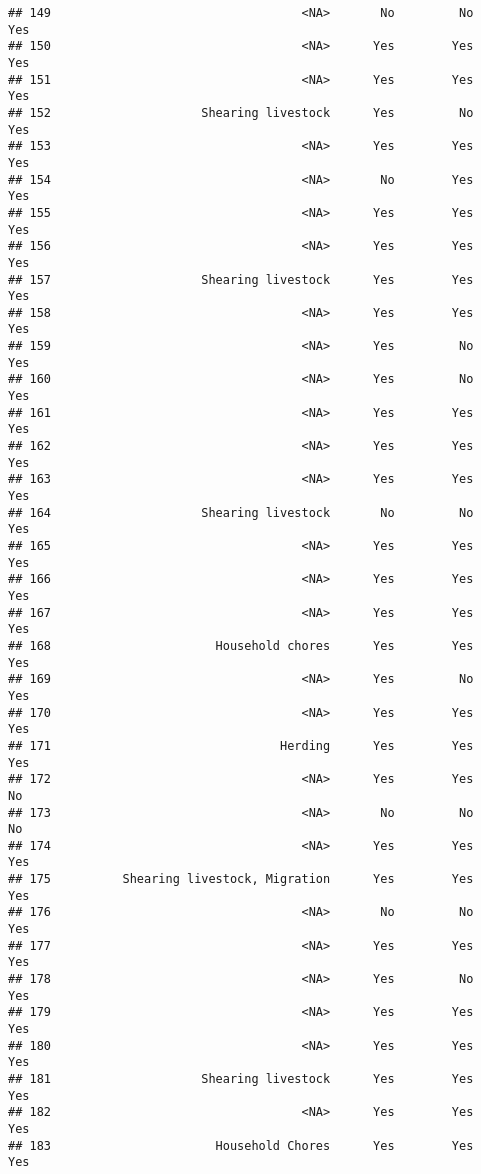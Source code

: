 \documentclass[
]{article}
\begin{document}
\begin{verbatim}
## 149                                   <NA>       No         No      Yes
## 150                                   <NA>      Yes        Yes      Yes
## 151                                   <NA>      Yes        Yes      Yes
## 152                     Shearing livestock      Yes         No      Yes
## 153                                   <NA>      Yes        Yes      Yes
## 154                                   <NA>       No        Yes      Yes
## 155                                   <NA>      Yes        Yes      Yes
## 156                                   <NA>      Yes        Yes      Yes
## 157                     Shearing livestock      Yes        Yes      Yes
## 158                                   <NA>      Yes        Yes      Yes
## 159                                   <NA>      Yes         No      Yes
## 160                                   <NA>      Yes         No      Yes
## 161                                   <NA>      Yes        Yes      Yes
## 162                                   <NA>      Yes        Yes      Yes
## 163                                   <NA>      Yes        Yes      Yes
## 164                     Shearing livestock       No         No      Yes
## 165                                   <NA>      Yes        Yes      Yes
## 166                                   <NA>      Yes        Yes      Yes
## 167                                   <NA>      Yes        Yes      Yes
## 168                       Household chores      Yes        Yes      Yes
## 169                                   <NA>      Yes         No      Yes
## 170                                   <NA>      Yes        Yes      Yes
## 171                                Herding      Yes        Yes      Yes
## 172                                   <NA>      Yes        Yes       No
## 173                                   <NA>       No         No       No
## 174                                   <NA>      Yes        Yes      Yes
## 175          Shearing livestock, Migration      Yes        Yes      Yes
## 176                                   <NA>       No         No      Yes
## 177                                   <NA>      Yes        Yes      Yes
## 178                                   <NA>      Yes         No      Yes
## 179                                   <NA>      Yes        Yes      Yes
## 180                                   <NA>      Yes        Yes      Yes
## 181                     Shearing livestock      Yes        Yes      Yes
## 182                                   <NA>      Yes        Yes      Yes
## 183                       Household Chores      Yes        Yes      Yes

\end{verbatim}
\end{document}
